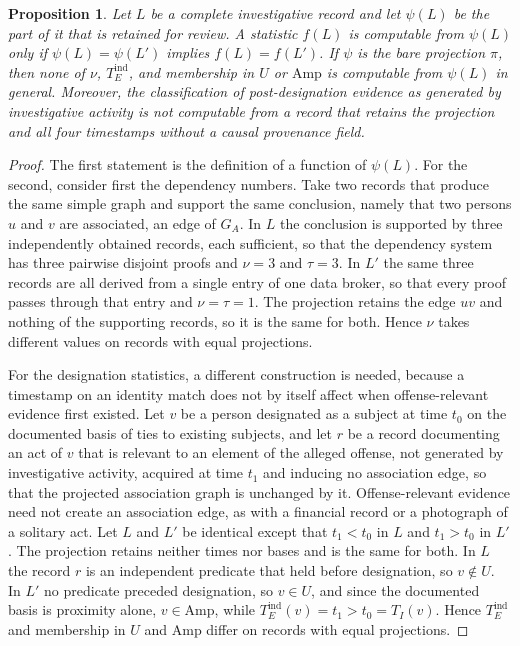 \documentclass[11pt]{article}
\newtheorem{proposition}{Proposition}
\theoremstyle{definition}
\theoremstyle{remark}
\begin{document}
\begin{proposition}
Let $L$ be a complete investigative record and let $\psi(L)$ be the part of it that is retained for review. A statistic $f(L)$ is computable from $\psi(L)$ only if $\psi(L) = \psi(L')$ implies $f(L) = f(L')$. If $\psi$ is the bare projection $\pi$, then none of $\nu$, $T_E^{\mathrm{ind}}$, and membership in $U$ or $\mathrm{Amp}$ is computable from $\psi(L)$ in general. Moreover, the classification of post-designation evidence as generated by investigative activity is not computable from a record that retains the projection and all four timestamps without a causal provenance field.
\end{proposition}

\begin{proof}
The first statement is the definition of a function of $\psi(L)$. For the second, consider first the dependency numbers. Take two records that produce the same simple graph and support the same conclusion, namely that two persons $u$ and $v$ are associated, an edge of $G_A$. In $L$ the conclusion is supported by three independently obtained records, each sufficient, so that the dependency system has three pairwise disjoint proofs and $\nu = 3$ and $\tau = 3$. In $L'$ the same three records are all derived from a single entry of one data broker, so that every proof passes through that entry and $\nu = \tau = 1$. The projection retains the edge $uv$ and nothing of the supporting records, so it is the same for both. Hence $\nu$ takes different values on records with equal projections.

For the designation statistics, a different construction is needed, because a timestamp on an identity match does not by itself affect when offense-relevant evidence first existed. Let $v$ be a person designated as a subject at time $t_0$ on the documented basis of ties to existing subjects, and let $r$ be a record documenting an act of $v$ that is relevant to an element of the alleged offense, not generated by investigative activity, acquired at time $t_1$ and inducing no association edge, so that the projected association graph is unchanged by it. Offense-relevant evidence need not create an association edge, as with a financial record or a photograph of a solitary act. Let $L$ and $L'$ be identical except that $t_1 < t_0$ in $L$ and $t_1 > t_0$ in $L'$. The projection retains neither times nor bases and is the same for both. In $L$ the record $r$ is an independent predicate that held before designation, so $v \notin U$. In $L'$ no predicate preceded designation, so $v \in U$, and since the documented basis is proximity alone, $v \in \mathrm{Amp}$, while $T_E^{\mathrm{ind}}(v) = t_1 > t_0 = T_I(v)$. Hence $T_E^{\mathrm{ind}}$ and membership in $U$ and $\mathrm{Amp}$ differ on records with equal projections.


\end{proof}
\end{document}
